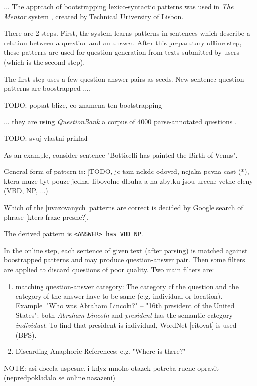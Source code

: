 \documentclass[a4paper, 12pt, twoside]{fithesis2}		%
\renewcommand{\_}{\leavevmode \kern0.0em\vbox{\hrule width0.4em}}
\begin{document}
... The approach of bootstrapping lexico-syntactic patterns was used
in \textit{The Mentor} system \cite{mentor}, created by Technical University of Lisbon.

There are 2 steps.
First, the system learns patterns in sentences which describe a relation between a question and an answer.
After this preparatory offline step, these patterns are used for question generation from texts submitted by users (which is the second step).

The first step uses a few question-answer pairs as seeds.
New sentence-question patterns are boostrapped ....

TODO: popsat blize, co znamena ten bootstrapping

... they are using \textit{QuestionBank} a corpus of 4000 parse-annotated questions \cite{question-bank}.

TODO: svuj vlastni priklad

As an example, consider sentence "Botticelli has painted the Birth of Venus".

General form of pattern is: [TODO, je tam nekde odoved, nejaka pevna cast (*), ktera muze byt pouze jedna, libovolne dlouha a na zbytku jsou urcene vetne cleny (VBD, NP, ...)]

Which of the [uvazovanych] patterns are correct is decided by
Google search of phrase [ktera fraze presne?].

The derived pattern is \texttt{<ANSWER> has VBD NP}.



In the online step, each sentence of given text (after parsing) is matched against boostrapped patterns
and may produce question-answer pair.
Then some filters are applied to discard questions of poor quality. Two main filters are:

\begin{enumerate}
  \item matching question-answer category:
    The category of the question and the category of the answer have to be same (e.g. individual or location). Example: "Who was Abraham Lincoln?" -- "16th president of the United States": both \textit{Abraham Lincoln} and \textit{president} has the semantic category \textit{individual}.
    To find that president is individual, WordNet [citovat] is used (BFS).
  \item Discarding Anaphoric References: e.g. "Where is there?"
\end{enumerate}


NOTE: asi docela uspesne, i kdyz mnoho otazek potreba rucne opravit (nepredpokladalo se online nasazeni)
\end{document}
